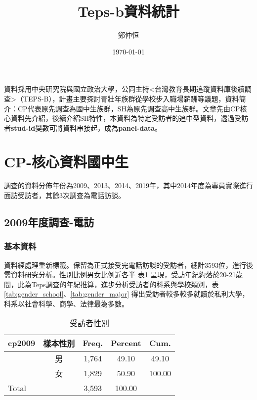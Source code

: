 \documentclass[12pt, a4paper]{article}
\title{ Teps-b資料統計}
\author{{\SM 鄭仲恒}}
\date{{\TT \today}}
\begin{document}
\maketitle
\fontsize{12}{22 pt}\selectfont
資料採用中央研究院與國立政治大學，公同主持<台灣教育長期追蹤資料庫後續調查>（TEPS-B），計畫主要探討青壯年族群從學校步入職場薪酬等議題，資料簡介：CP代表原先調查為國中生族群，SH為原先調查高中生族群。文章先由CP核心資料先介紹，後續介紹SH特性，本資料為特定受訪者的追中型資料，透過受訪者\textbf{stud-id}變數可將資料串接起，成為\textbf{panel-data}。



\section{CP-核心資料國中生}
調查的資料分佈年份為2009、2013、2014、2019年，其中2014年度為專員實際進行面訪受訪者，其餘3次調查為電話訪談。
\subsection{2009年度調查-電訪}

\subsubsection{基本資料}
資料經處理重新標籤。保留為正式接受完電話訪談的受訪者，總計3593位，進行後需資料研究分析。性別比例男女比例近各半 表\ref{tab:gender} 呈現，受訪年紀約落於20-21歲間，此為Teps調查的年紀推算，進步分析受訪者的科系與學校類別，表 \ref{tab:gender_school}、\ref{tab:gender_major} 得出受訪者較多較多就讀於私利大學，科系以社會科學、商學、法律最為多數。


\begin{table}[htbp]
  \centering
   \caption{受訪者性別}
  \begin{adjustbox}{width=0.5\textwidth}
    \begin{tabular}{lcccc}
      \toprule
      cp2009 & 樣本性別 & Freq. & Percent & Cum. \\
      \midrule
      & 男 & 1,764 & 49.10 & 49.10 \\
      & 女 & 1,829 & 50.90 & 100.00 \\
      \midrule
      Total & & 3,593 & 100.00 & \\
      \bottomrule
    \end{tabular}
    \label{tab:gender}
  \end{adjustbox}
\end{table}
\end{document}
